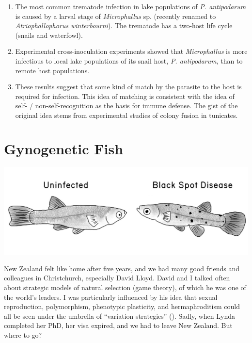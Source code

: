 \documentclass[
  letterpaper,
]{book}
\providecommand{\tightlist}{%
  \setlength{\itemsep}{0pt}\setlength{\parskip}{0pt}}\usepackage{longtable,booktabs,array}
\begin{document}
\begin{enumerate}
\def\labelenumi{\arabic{enumi}.}
\tightlist
\item
  The most common trematode infection in lake populations of \emph{P.
  antipodarum} is caused by a larval stage of \emph{Microphallus} sp.
  (recently renamed to \emph{Atriophallophorus winterbourni}). The
  trematode has a two-host life cycle (snails and waterfowl).
\item
  Experimental cross-inoculation experiments showed that
  \emph{Microphallus} is more infectious to local lake populations of
  its snail host, \emph{P. antipodarum}, than to remote host
  populations.
\item
  These results suggest that some kind of match by the parasite to the
  host is required for infection. This idea of matching is consistent
  with the idea of self- / non-self-recognition as the basis for immune
  defense. The gist of the original idea stems from experimental studies
  of colony fusion in tunicates.
\end{enumerate}


\chapter{Gynogenetic Fish}\label{sec-gyno}

\begin{center}
\includegraphics{images/fig5-1.jpeg}
\end{center}

New Zealand felt like home after five years, and we had many good
friends and colleagues in Christchurch, especially David Lloyd. David
and I talked often about strategic models of natural selection (game
theory), of which he was one of the world's leaders. I was particularly
influenced by his idea that sexual reproduction, polymorphism,
phenotypic plasticity, and hermaphroditism could all be seen under the
umbrella of ``variation strategies'' (). Sadly, when Lynda completed her PhD, her visa expired, and we
had to leave New Zealand. But where to go?
\end{document}
